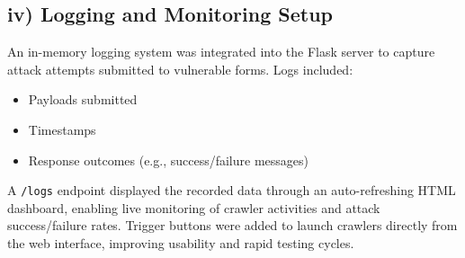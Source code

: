 \subsection{iv) Logging and Monitoring Setup}
An in-memory logging system was integrated into the Flask server to capture attack attempts submitted to vulnerable forms. Logs included:
\begin{itemize}[topsep=2pt,itemsep=2pt]
  \item Payloads submitted  
  \item Timestamps  
  \item Response outcomes (e.g., success/failure messages)
\end{itemize}
A \texttt{/logs} endpoint displayed the recorded data through an auto-refreshing HTML dashboard, enabling live monitoring of crawler activities and attack success/failure rates. Trigger buttons were added to launch crawlers directly from the web interface, improving usability and rapid testing cycles.









